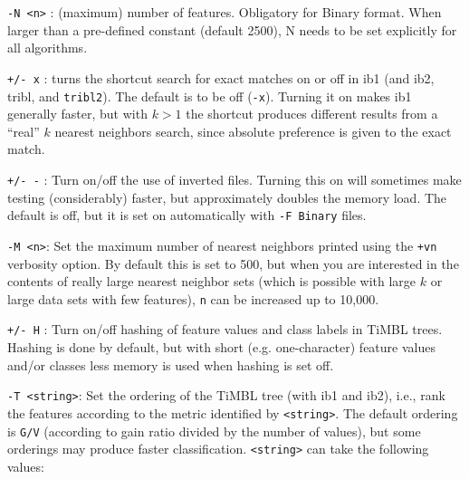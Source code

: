 \documentclass{report}
\begin{document}
\begin{description}

\item {\tt -N <n>} : (maximum) number of features. Obligatory for
Binary format. When larger than a pre-defined constant (default 2500),
N needs to be set explicitly for all algorithms.

\item {\tt +/- x} : turns the shortcut search for exact matches on or
off in {\sc ib1} (and {\sc ib2}, {\sc tribl}, and {\tt tribl2}). The
default is to be off ({\tt -x}). Turning it on makes {\sc ib1}
generally faster, but with $k>1$ the shortcut produces different
results from a ``real'' $k$ nearest neighbors search, since absolute
preference is given to the exact match.

\item {\tt +/- -} : Turn on/off the use of inverted files. Turning
this on will sometimes make testing (considerably) faster, but
approximately doubles the memory load. The default is off, but it is
set on automatically with {\tt -F Binary} files.

\item {\tt -M <n>}: Set the maximum number of nearest neighbors
printed using the {\tt +vn} verbosity option. By default this is set
to 500, but when you are interested in the contents of really large
nearest neighbor sets (which is possible with large $k$ or large data
sets with few features), {\tt n} can be increased up to 10,000.

\item {\tt +/- H} : Turn on/off hashing of feature values and class
labels in TiMBL trees. Hashing is done by default, but with short
(e.g. one-character) feature values and/or classes less memory is used
when hashing is set off.

\item {\tt -T <string>}: Set the ordering of the TiMBL tree (with {\sc
ib1} and {\sc ib2}), i.e., rank the features according to the metric
identified by {\tt <string>}. The default ordering is {\tt G/V}
(according to gain ratio divided by the number of values), but some
orderings may produce faster classification. {\tt <string>} can take the
following values:


\end{description}
\end{document}
